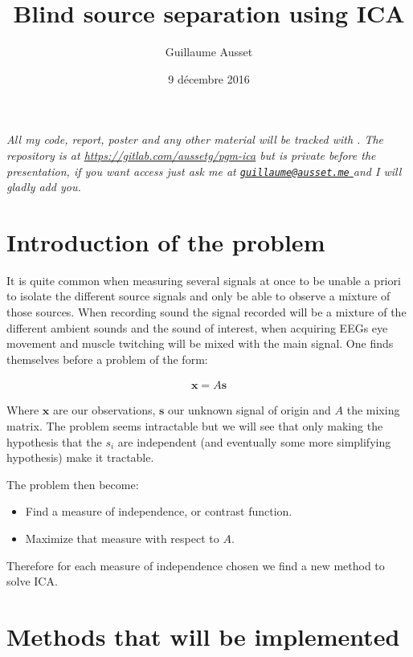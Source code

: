 \documentclass[11pt]{article}
\begin{document}
\date{9 décembre 2016}
\author{Guillaume Ausset}
\title{Blind source separation using ICA}
\maketitle

\emph{All my code, report, poster and any other material will be tracked with . The repository is at \url{https://gitlab.com/aussetg/pgm-ica} but is private before the presentation, if you want access just ask me at \href{mailto:guillaume@ausset.me}{\nolinkurl{guillaume@ausset.me} } and I will gladly add you.}

\section{Introduction of the problem}

It is quite common when measuring several signals at once to be unable a priori to isolate the different source signals and only be able to observe a mixture of those sources. When recording sound the signal recorded will be a mixture of the different ambient sounds and the sound of interest, when acquiring EEGs eye movement and muscle twitching will be mixed with the main signal. One finds themselves before a problem of the form:

\begin{align*}
	\mathbf{x} = A \mathbf{s}
\end{align*} 

Where $\mathbf{x}$ are our observations, $\mathbf{s}$ our unknown signal of origin and $A$ the mixing matrix.
The problem seems intractable but we will see that only making the hypothesis that the $s_i$ are independent (and eventually some more simplifying hypothesis) make it tractable.

The problem then become:
\begin{itemize}
	\item Find a measure of independence, or contrast function.
	\item Maximize that measure with respect to $A$.
\end{itemize}

Therefore for each measure of independence chosen we find a new method to solve ICA.

\section{Methods that will be implemented}
\end{document}

